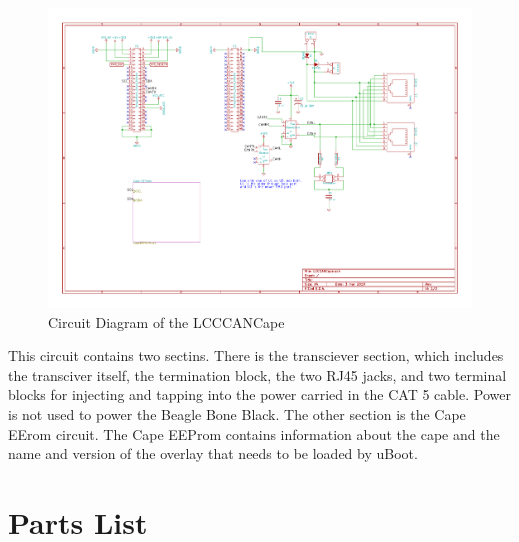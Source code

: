 \begin{figure}[hbpt]\begin{centering}%
\includegraphics[width=5in]{LCCCANCape-1.pdf}                               
\caption{Circuit Diagram of the LCCCANCape}                               
\end{centering}\end{figure}                                                    
This circuit contains two sectins.  There is the transciever section, which 
includes the transciver itself, the termination block, the two RJ45 jacks, and 
two terminal blocks for injecting and tapping into the power carried in the 
CAT 5 cable.  Power is not used to power the Beagle Bone Black.  The other 
section is the Cape EErom circuit.  The Cape EEProm contains         
information about the cape and the name and version of the overlay that needs  
to be loaded by uBoot.  

\clearpage

\section{Parts List}


